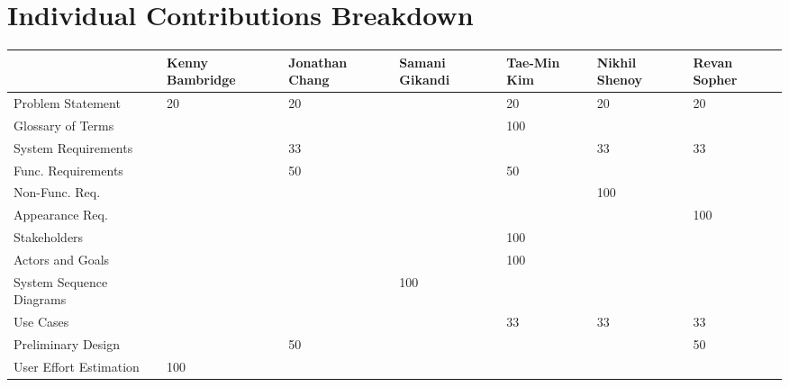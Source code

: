 \documentclass[letterpaper,english, 12pt]{scrreprt}
\begin{document}
\chapter*{Individual Contributions Breakdown}
\begin{center}
	\begin{tabular}{|l|C{2cm}|C{1.5cm}|C{1.5cm}|C{1.5cm}|C{1.5cm}|C{1.5cm}|}
		\hline
                        &Kenny Bambridge& Jonathan Chang& Samani Gikandi& Tae-Min Kim   & Nikhil Shenoy & Revan Sopher  \\ \hline
Problem Statement       &      20       &      20       &               &      20       &       20      &       20      \\ \hline
Glossary of Terms       &               &               &               &     100       &               &               \\ \hline

System Requirements     &               &      33       &               &               &       33      &       33      \\ \hline
Func. Requirements      &               &      50       &               &      50       &               &               \\ \hline
Non-Func. Req.          &               &               &               &               &      100      &               \\ \hline
Appearance Req.         &               &               &               &               &               &      100      \\ \hline

Stakeholders            &               &               &               &     100       &               &               \\ \hline
Actors and Goals        &               &               &               &     100       &               &               \\ \hline
System Sequence Diagrams&               &               &      100      &               &               &               \\ \hline
Use Cases               &               &               &               &      33       &       33      &       33      \\ \hline

Preliminary Design      &               &      50       &               &               &               &       50      \\ \hline
User Effort Estimation  &     100       &               &               &               &               &               \\ \hline


\end{tabular}
\end{center}
\end{document}
